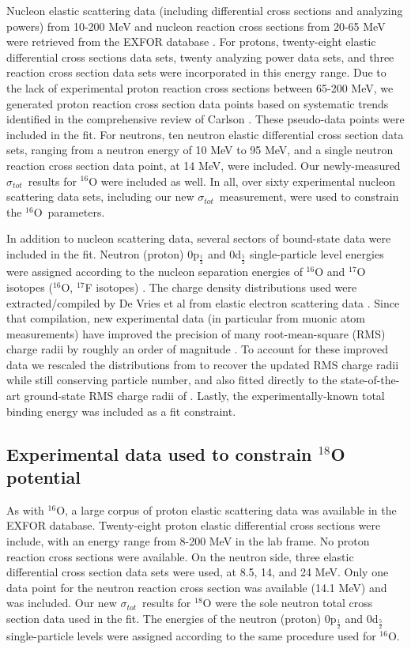 \documentclass[twocolumn,secnumarabic,amssymb, nobibnotes, aps, prl,
superscriptaddress, nobalancelastpage]{revtex4}
\newcommand{\tot}{\ensuremath{\sigma_{tot}}}
\newcommand{\oSix}{\ensuremath{^{16}}O}
\begin{document}
Nucleon elastic scattering data (including differential cross sections and analyzing
powers) from 10-200 MeV and nucleon reaction cross sections from 20-65 MeV
were retrieved from the EXFOR database \cite{EXFORDatabase}.
For protons, twenty-eight elastic differential cross
sections data sets, twenty analyzing power data sets,
and three reaction cross section data sets were
incorporated in this energy range. Due to the lack of experimental proton
reaction cross sections between 65-200 MeV, we generated proton reaction cross
section data points based on systematic trends identified in the comprehensive
review of Carlson \cite{Carlson1996}. These pseudo-data points were included in the fit.
For neutrons, ten neutron elastic differential cross section
data sets, ranging from a neutron energy of 10 MeV to 95 MeV, and a single
neutron reaction cross section data point, at 14 MeV, were included. 
Our newly-measured \tot\ results for $^{16}$O were included as well. In all,
over sixty experimental nucleon scattering data sets, including our new \tot\ 
measurement, were used to constrain the \oSix\ parameters.

In addition to nucleon scattering data, several sectors of bound-state data were
included in the fit. Neutron (proton) 0p$_{\frac{1}{2}}$ and 0d$_{\frac{5}{2}}$
single-particle level energies were
assigned according to the nucleon separation energies of $^{16}$O and
$^{17}$O isotopes ($^{16}$O, $^{17}$F isotopes) \cite{AME2016}.
The charge density distributions used were extracted/compiled by
De Vries et al from elastic electron scattering data
\cite{DeVries1987}. Since that compilation, new experimental
data (in particular from muonic atom measurements) have improved the precision
of many root-mean-square (RMS) charge radii by
roughly an order of magnitude \cite{Angeli2013}. To account for these improved
data we rescaled the distributions from \cite{DeVries1987} to recover the updated
RMS charge radii while still conserving particle number, and also fitted directly
to the state-of-the-art ground-state RMS charge radii of \cite{Angeli2013}.
Lastly, the experimentally-known total binding energy was included as a fit constraint. 

\subsection{Experimental data used to constrain $^{18}$O potential}

As with $^{16}$O, a large corpus of proton elastic scattering data was
available in the EXFOR database. Twenty-eight proton elastic differential cross
sections were include, with an energy range from 8-200 MeV in the lab frame.
No proton reaction cross sections were available. On the neutron side, three
elastic differential cross section data sets were used, at 8.5, 14, and 24 MeV.
Only one data point for the neutron reaction cross section was available (14.1
MeV) and was included. Our new \tot\ results for $^{18}$O were the
sole neutron total cross section data used in the fit. The energies of the
neutron (proton) 0p$_{\frac{1}{2}}$ and 0d$_{\frac{5}{2}}$ single-particle
levels were assigned according to the same procedure used for \oSix.
\end{document}
